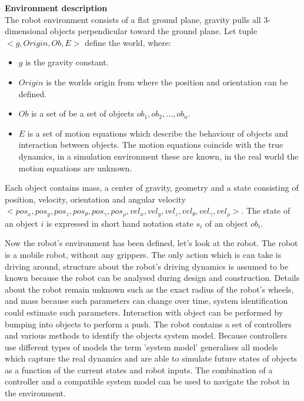 \begin{definition}
\label{definition: robot_world} \textbf{Environment description}\\
The robot environment consists of a flat ground plane, gravity pulls all 3-dimensional objects perpendicular toward the ground plane. Let tuple $<g, Origin, Ob, E>$ define the world, where:
\begin{itemize}
    \item $g$ is the gravity constant.
    \item $Origin$ is the worlds origin from where the position and orientation can be defined.
    \item $Ob$ is a set of be a set of objects $ob_1, ob_2, \dots, ob_n$.
    \item $E$ is a set of motion equations which describe the behaviour of objects and interaction between objects. The motion equations coincide with the true dynamics, in a simulation environment these are known, in the real world the motion equations are unknown.
\end{itemize} 

Each object contains mass, a center of gravity, geometry and a state consisting of position, velocity, orientation and angular velocity $< pos_x, pos_y, pos_z, pos_\theta, pos_\gamma, pos_\rho, vel_x, vel_y, vel_z, vel_\theta, vel_\gamma, vel_\rho>$. The state of an object $i$ is expressed in short hand notation state $s_i$ of an object $ob_i$.  
\end{definition}

Now the robot's environment has been defined, let's look at the robot. The robot is a mobile robot, without any grippers. The only action which is can take is driving around, structure about the robot's driving dynamics is assumed to be known because the robot can be analysed during design and construction. Details about the robot remain unknown such as the exact radius of the robot's wheels, and mass because such parameters can change over time, system identification could estimate such parameters. Interaction with object can be performed by bumping into objects to perform a push. The robot contains a set of controllers and various methods to identify the objects system model. Because controllers use different types of models the term 'system model' generalises all models which capture the real dynamics and are able to simulate future states of objects as a function of the current states and robot inputs. The combination of a controller and a compatible system model can be used to navigate the robot in the environment. \\

